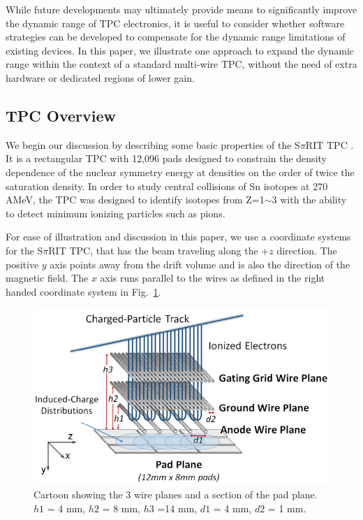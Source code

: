 \documentclass[review]{elsarticle}
\begin{document}
While future developments may ultimately provide means to significantly improve the dynamic range of TPC electronics, it is useful to consider whether software strategies can be developed to compensate for the dynamic range limitations of existing devices. In this paper, we illustrate one approach to expand the dynamic range within the context of a standard multi-wire TPC, without the need of extra hardware or dedicated regions of lower gain.


\subsection{TPC Overview}
We begin our discussion by describing some basic properties of the S$\pi$RIT TPC \citep{shane}. It is a rectangular TPC with 12,096 pads designed to constrain the density dependence of the nuclear symmetry energy at densities on the order of twice the saturation density. In order to study central collisions of Sn isotopes at 270 AMeV, the TPC was designed to identify isotopes from Z=1$\sim$3 with the ability to detect minimum ionizing particles such as pions. 

For ease of illustration and discussion in this paper, we use a coordinate systems for the S$\pi$RIT TPC, that has the beam traveling along the +$z$ direction. The positive $y$ axis points away from the drift volume and is also the direction of the magnetic field. The $x$ axis runs parallel to the wires as defined in the right handed coordinate system in Fig.~\ref{fig:padwire}.

\begin{figure}[ht!]
\includegraphics[width=\linewidth]{padwire}
\caption{Cartoon showing the 3 wire planes and a section of the pad plane. $h1$ = 4 mm, $h2$ = 8 mm, $h3$ =14 mm, $d1$ = 4 mm, $d2$ = 1 mm.}
\label{fig:padwire}
\end{figure}
\end{document}
